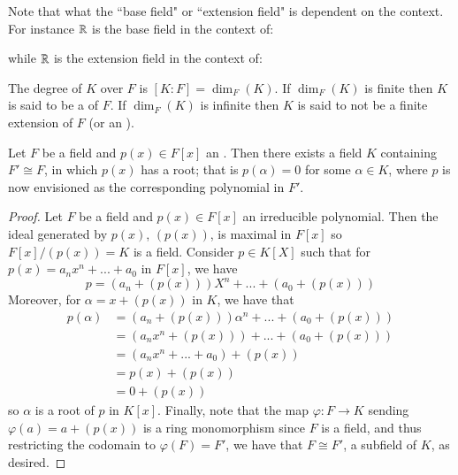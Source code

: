 Note that what the ``base field" or ``extension field" is dependent on the context. For instance $\mathbb R$ is the base field in the context of:
\begin{center}
\end{center}
while $\mathbb R$ is the extension field in the context of:
\begin{center}
\end{center}



\begin{definition}
    The degree of $K$ over $F$ is $[K:F] = \dim_F(K)$. If $\dim_F(K)$ is finite then $K$ is said to be a  of $F$. If $\dim_F(K)$ is infinite then $K$ is said to not be a finite extension of $F$ (or an ).
\end{definition}


\begin{theorem}\label{thm:existext}
    Let $F$ be a field and $p(x) \in F[x]$ an . Then there exists a field $K$ containing $F' \cong F$, in which $p(x)$ has a root; that is $p(\alpha) = 0$ for some $\alpha \in K$, where $p$ is now envisioned as the corresponding polynomial in $F'$.
\end{theorem}
\begin{proof}
    Let $F$ be a field and $p(x) \in F[x]$ an irreducible polynomial. Then the ideal generated by $p(x)$, $(p(x))$, is maximal in $F[x]$ so $F[x]/(p(x)) = K$ is a field. Consider $p \in K[X]$ such that for $p(x) = a_nx^n+...+a_0$ in $F[x]$, we have $$p = (a_n+(p(x)))X^n+...+(a_0+(p(x)))$$  Moreover, for $\alpha = x + (p(x))$ in $K$, we have that \begin{align*}
        p(\alpha) &= (a_n+(p(x)))\alpha^n+...+(a_0+(p(x))) \\
        &= (a_nx^n+(p(x))) + ... + (a_0+(p(x))) \\
        &= (a_nx^n+...+a_0) + (p(x)) \\
        &= p(x) + (p(x)) \\
        &= 0 + (p(x))
    \end{align*}
    so $\alpha$ is a root of $p$ in $K[x]$. Finally, note that the map $\varphi:F\rightarrow K$ sending $\varphi(a) = a+(p(x))$ is a ring monomorphism since $F$ is a field, and thus restricting the codomain to $\varphi(F) = F'$, we have that $F \cong F'$, a subfield of $K$, as desired.
\end{proof}


